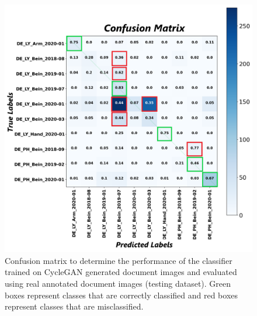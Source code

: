\begin{figure}[H]
    \begin{center}
	\includegraphics[scale=0.20]{images/Evaluation/Confusion_Matrix_CycleGAN_Generated_Data_Classifier_2021-06-02_21-55-39.png}
	\caption[Confusion matrix to determine the performance of the classifier trained on \ac{CycleGAN} generated document images and evaluated using real annotated document images (test dataset).]{Confusion matrix to determine the performance of the classifier trained on \ac{CycleGAN} generated document images and evaluated using real annotated document images (testing dataset). Green boxes represent classes that are correctly classified and red boxes represent classes that are misclassified.}
	\label{fig:CMCycleganGeneratedDocumentImagesClassifier}
	\end{center}
\end{figure}

